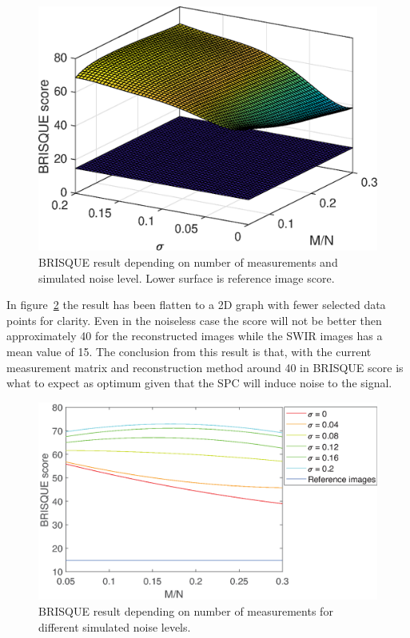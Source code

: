 \begin{figure}[H]
    \centering
    \includegraphics[width = 0.7\linewidth]{result/synt_brisque/BRISQUE_fit.eps}
    \caption{BRISQUE result depending on number of measurements and simulated noise level. Lower surface is reference image score.}
    \label{fig:Brisque_3d}
\end{figure}

In figure~\ref{fig:Brisque_2d} the result has been flatten to a 2D graph with fewer selected data points for clarity. Even in the noiseless case the score will not be better then approximately 40 for the reconstructed images while the SWIR images has a mean value of 15. The conclusion from this result is that, with the current measurement matrix and reconstruction method around 40 in BRISQUE score is what to expect as optimum given that the SPC will induce noise to the signal.   

\begin{figure}[H]
    \centering
    \includegraphics[width = 0.95\linewidth]{result/synt_brisque/Brisque_fit_flat3.eps}
    \caption{BRISQUE result depending on number of measurements for different simulated noise levels.}
    \label{fig:Brisque_2d}
\end{figure}







